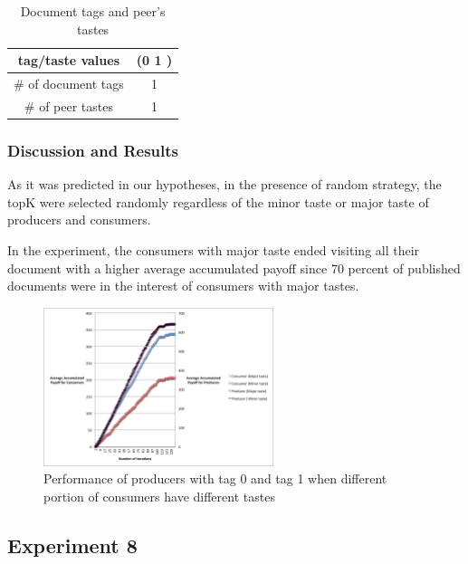 \documentclass [12pt]{article} \usepackage{multicol}
\begin{document}
\begin{table}[h!]
\caption{Document tags and peer's tastes}

\begin{center}

\begin{tabular}{|c|c|}
\hline tag/taste values & (0 1 )\\
\hline \# of document tags   &  1\\ \hline 
\# of peer tastes  &  1 \\ \hline 
\end{tabular}

\end{center}
\label{default}
\end{table}

\subsubsection{Discussion and Results}
As it was predicted in our hypotheses, in the presence of random strategy, the topK were selected randomly regardless of the minor taste or major taste of producers and consumers. 
  
In the experiment, the consumers with major taste ended visiting all their document with a higher average accumulated payoff since 70 percent of published documents were in the interest of consumers with major tastes. 


\begin{figure}[h!]
\begin{center}
\includegraphics[width=0.6\textwidth,center]{images/EXP6-RandomStrategy-prod-cons}
\caption{Performance of producers with tag 0 and tag 1 when different portion of consumers have different tastes}
\label{fig:images/EXP3-2}
\end{center}
\end{figure}


\subsection{Experiment 8}
\end{document}
